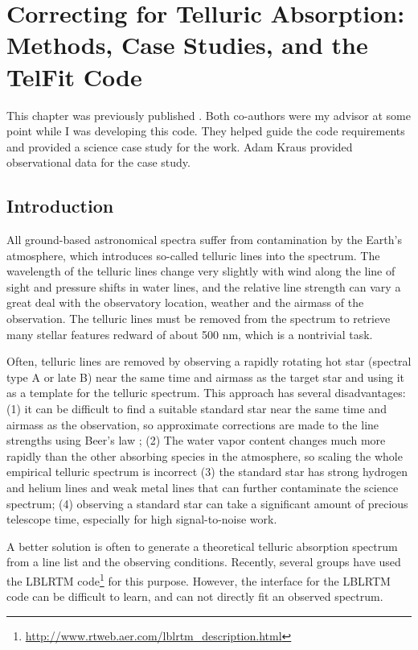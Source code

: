 
\chapter{Correcting for Telluric Absorption: Methods, Case Studies, and the TelFit Code}
\label{chap:telfit}
This chapter was previously published \citep{Gullikson2014}. Both co-authors were my advisor at some point while I was developing this code. They helped guide the code requirements and provided a science case study for the work. Adam Kraus provided observational data for the case study.

\section{Introduction}
All ground-based astronomical spectra suffer from contamination by the Earth's atmosphere, which introduces so-called telluric lines into the spectrum. The wavelength of the telluric lines change very slightly with wind along the line of sight and pressure shifts in water lines, and the relative line strength can vary a great deal with the observatory location, weather and the airmass of the observation. The telluric lines must be removed from the spectrum to retrieve many stellar features redward of about 500 nm, which is a nontrivial task.

Often, telluric lines are removed by observing a rapidly rotating hot star (spectral type A or late B) near the same time and airmass as the target star and using it as a template for the telluric spectrum. This approach has several disadvantages: (1) it can be difficult to find a suitable standard star near the same time and airmass as the observation, so approximate corrections are made to the line strengths using Beer's law \citep{Beer1852}; (2) The water vapor content changes much more rapidly than the other absorbing species in the atmosphere, so scaling the whole empirical telluric spectrum is incorrect (3) the standard star has strong hydrogen and helium lines and weak metal lines that can further contaminate the science spectrum; (4) observing a standard star can take a significant amount of precious telescope time, especially for high signal-to-noise work.

A better solution is often to generate a theoretical telluric absorption spectrum from a line list and the observing conditions. Recently, several groups \citep{Seifahrt2011, Bertaux2013, Husser2013, Cotton2013, Gullikson2013} have used the LBLRTM code\footnote{\url{http://www.rtweb.aer.com/lblrtm_description.html}} \citep[][Line By Line Radiative Transfer Model]{Clough2005} for this purpose. However, the interface for the LBLRTM code can be difficult to learn, and can not directly fit an observed spectrum.

